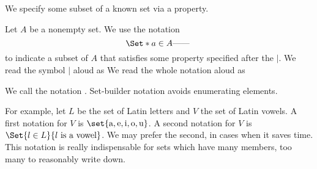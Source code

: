 
\sbasic



\sstart



We specify some
subset of a known
set via a property.



Let $A$ be a nonempty set.
We use the notation
\[
  \Set*{a \in A}{\text{------}\;}
\]
to indicate a subset of $A$ that
satisfies some property specified
after the $\mid$.
We read the symbol $\mid$ aloud as
We read the whole notation aloud as

We call the notation
.
Set-builder notation avoids enumerating
elements.


For example, let $L$
be the set of Latin letters
and $V$ the set of Latin
vowels.
A first notation for $V$ is
$\set{\text{a},\text{e},\text{i},\text{o},\text{u}}$.
A second notation for $V$ is
$\Set{l \in L}{l \text{ is a vowel}}$.
We may prefer the second, in cases
when it saves time.
This notation is really indispensable for
sets which have many members, too many
to reasonably write down.


\strats
